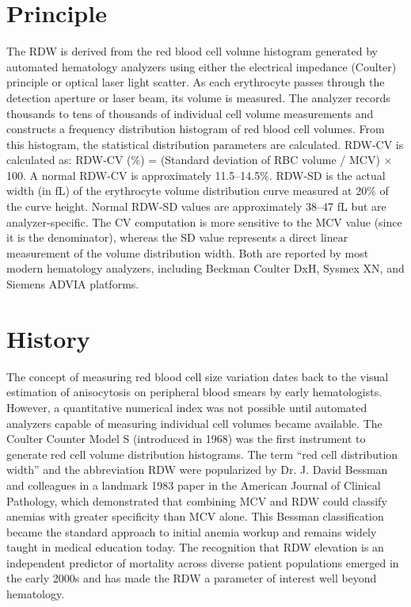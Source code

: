 \section*{Principle}
The RDW is derived from the red blood cell volume histogram generated by automated hematology analyzers using either the electrical impedance (Coulter) principle or optical laser light scatter. As each erythrocyte passes through the detection aperture or laser beam, its volume is measured. The analyzer records thousands to tens of thousands of individual cell volume measurements and constructs a frequency distribution histogram of red blood cell volumes. From this histogram, the statistical distribution parameters are calculated. RDW-CV is calculated as: RDW-CV (\%) = (Standard deviation of RBC volume / MCV) $\times$ 100. A normal RDW-CV is approximately 11.5--14.5\%. RDW-SD is the actual width (in fL) of the erythrocyte volume distribution curve measured at 20\% of the curve height. Normal RDW-SD values are approximately 38--47 fL but are analyzer-specific. The CV computation is more sensitive to the MCV value (since it is the denominator), whereas the SD value represents a direct linear measurement of the volume distribution width. Both are reported by most modern hematology analyzers, including Beckman Coulter DxH, Sysmex XN, and Siemens ADVIA platforms.

\section*{History}
The concept of measuring red blood cell size variation dates back to the visual estimation of anisocytosis on peripheral blood smears by early hematologists. However, a quantitative numerical index was not possible until automated analyzers capable of measuring individual cell volumes became available. The Coulter Counter Model S (introduced in 1968) was the first instrument to generate red cell volume distribution histograms. The term ``red cell distribution width'' and the abbreviation RDW were popularized by Dr. J. David Bessman and colleagues in a landmark 1983 paper in the American Journal of Clinical Pathology, which demonstrated that combining MCV and RDW could classify anemias with greater specificity than MCV alone. This Bessman classification became the standard approach to initial anemia workup and remains widely taught in medical education today. The recognition that RDW elevation is an independent predictor of mortality across diverse patient populations emerged in the early 2000s and has made the RDW a parameter of interest well beyond hematology.

